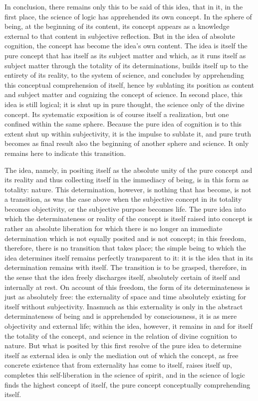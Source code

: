 In conclusion, there remains only this to be said of this idea,
that in it, in the first place,
the science of logic has apprehended its own concept.
In the sphere of being, at the beginning of its content,
its concept appears as a knowledge external to
that content in subjective reflection.
But in the idea of absolute cognition,
the concept has become the idea's own content.
The idea is itself the pure concept
that has itself as its subject matter
and which, as it runs itself as subject matter
through the totality of its determinations,
builds itself up to the entirety of its reality,
to the system of science,
and concludes by apprehending this
conceptual comprehension of itself,
hence by sublating its position
as content and subject matter
and cognizing the concept of science.
In second place, this idea is still logical;
it is shut up in pure thought,
the science only of the divine concept.
Its systematic exposition is of course itself a realization,
but one confined within the same sphere.
Because the pure idea of cognition is
to this extent shut up within subjectivity,
it is the impulse to sublate it,
and pure truth becomes as final result
also the beginning of another sphere and science.
It only remains here to indicate this transition.

The idea, namely, in positing itself
as the absolute unity of the pure concept and its reality
and thus collecting itself in the immediacy of being,
is in this form as totality:  nature.
This determination, however, is nothing that has become,
is not a transition, as was the case above
when the subjective concept in its totality becomes objectivity,
or the subjective purpose becomes life.
The pure idea into which the determinateness
or reality of the concept is itself
raised into concept is rather an
absolute liberation for which
there is no longer an immediate determination
which is not equally posited and is not concept;
in this freedom, therefore, there is
no transition that takes place;
the simple being to which the idea determines itself
remains perfectly transparent to it:
it is the idea that in its determination remains with itself.
The transition is to be grasped, therefore,
in the sense that the idea freely discharges itself,
absolutely certain of itself and internally at rest.
On account of this freedom, the form of
its determinateness is just as absolutely free:
the externality of space and time absolutely existing
for itself without subjectivity.
Inasmuch as this externality is only
in the abstract determinateness of being
and is apprehended by consciousness,
it is as mere objectivity and external life;
within the idea, however, it remains in
and for itself the totality of the concept,
and science in the relation of
divine cognition to nature.
But what is posited by this first resolve
of the pure idea to determine itself as external idea
is only the mediation out of which the concept,
as free concrete existence that from externality
has come to itself, raises itself up,
completes this self-liberation in the science of spirit,
and in the science of logic finds the highest concept of itself,
the pure concept conceptually comprehending itself.
